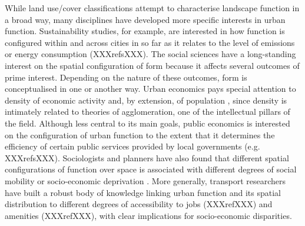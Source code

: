 While land use/cover classifications attempt to characterise landscape
function in a broad way, many disciplines have developed more specific
interests in urban function.
Sustainability studies, for example, are interested in how function is
configured within and across cities in so far as it relates to the level of
emissions \citep{angel2018shape} or energy consumption (XXXrefsXXX).
The social sciences have a long-standing interest on the spatial
configuration of form because it affects several outcomes of prime interest.
Depending on the nature of these outcomes, form is conceptualised in one or
another way.
Urban economics pays special attention to density of economic activity and, by
extension, of population \citep{ahlfeldt2019, duranton2020economics}, since
density is intimately related to theories of agglomeration, one of the
intellectual pillars of the field.
Although less central to its main goals, public economics is interested on the
configuration of urban function to the extent that it determines the
efficiency of certain public services provided by local governments (e.g.
XXXrefsXXX).
Sociologists and planners have also found that different spatial configurations of function
over space is associated with different degrees of social mobility
\citep{ewing2016does} or socio-economic deprivation
\citep{venerandi2018scalable}.
More generally, transport researchers have built a robust body of knowledge
linking urban function and its spatial distribution to different degrees of
accessibility to jobs (XXXrefXXX) and amenities (XXXrefXXX), with clear
implications for socio-economic disparities.


